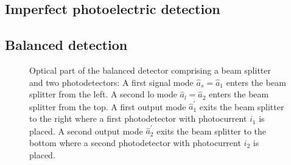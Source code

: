 \subsection{Imperfect photoelectric detection}


\subsection{Balanced detection}


\begin{figure}[htb]
    \centering
    
    \caption{Optical part of the balanced detector comprising a beam splitter and two photodetectors: A first signal mode $\hat{a}_s=\hat{a}_1$ enters the beam splitter from the left. A second \gls{lo} mode $\hat{a}_l=\hat{a}_2$ enters the beam splitter from the top. A first output mode $\hat{a}_1^\prime$ exits the beam splitter to the right where a first photodetector with photocurrent $i_1$ is placed. A second output mode $\hat{a}_2^\prime$ exits the beam splitter to the bottom where a second photodetector with photocurrent $i_2$ is placed.}\label{fig:balanced_detector_optics}
\end{figure}

